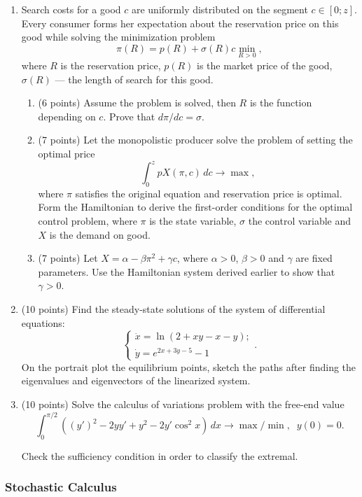 \documentclass[12pt, a4paper]{article}
\begin{document}
\begin{enumerate}
  \item Search costs for a good $c$ are uniformly distributed on the segment $c\in [0;z]$. Every consumer forms her expectation about the reservation price on this good while solving the minimization problem
\[
\pi(R) = p(R) + \sigma(R) c \min_{R>0},
\]
where $R$ is the reservation price, $p(R)$ is the market price of the good, $\sigma(R)$ — the length of search for this good.
\begin{enumerate}
  \item (6 points) Assume the problem is solved, then $R$ is the function depending on $c$. Prove that $d\pi /dc = \sigma$.
  \item (7 points) Let the monopolistic producer solve the problem of setting the optimal price
  \[
  \int_0^z p X(\pi, c) \, dc \to \max,
  \]
   where $\pi$ satisfies the original equation and reservation price is optimal. Form the Hamiltonian to derive the first-order conditions for the optimal control problem, where $\pi$ is the state variable, $\sigma$ the control variable and $X$ is the demand on good.
   \item (7 points) Let $X=\alpha - \beta \pi^2 + \gamma c$, where $\alpha >0$, $\beta >0$ and $\gamma$ are fixed parameters. Use the Hamiltonian system derived earlier to show that $\gamma>0$.

\end{enumerate}

\item  (10 points)
Find the steady-state solutions of the system of differential equations:
\[
\begin{cases}
\dot x = \ln (2 + xy -x -y);\\
\dot y = e^{2x+3y-5}-1
\end{cases}.
\]
On the portrait plot the equilibrium points, sketch the paths after finding the eigenvalues and eigenvectors of the linearized system.

\item (10 points)
Solve the calculus of variations problem with the free-end value
\[
\int_0^{\pi/2}((y')^2 -2yy'+y^2 - 2y'\cos^2 x) \, dx \to \max/\min, \;\;y(0)=0.
\]

Check the sufficiency condition in order to classify the extremal.
\end{enumerate}

\subsubsection*{Stochastic Calculus}
\end{document}
